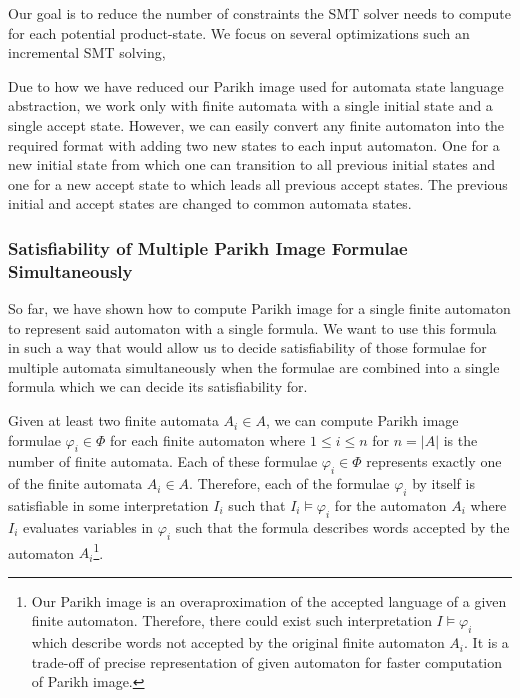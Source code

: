 
Our goal is to reduce the number of constraints the SMT solver needs to compute for each potential product-state. We focus on several optimizations such an incremental SMT solving,

Due to how we have reduced our Parikh image used for automata state language abstraction, we work only with finite automata with a single initial state and a single accept state. However, we can easily convert any finite automaton into the required format with adding two new states to each input automaton. One for a new initial state from which one can transition to all previous initial states and one for a new accept state to which leads all previous accept states. The previous initial and accept states are changed to common automata states.




\subsubsection{Satisfiability of Multiple Parikh Image Formulae Simultaneously}

So far, we have shown how to compute Parikh image for a single finite automaton to represent said automaton with a single formula. We want to use this formula in such a way that would allow us to decide satisfiability of those formulae for multiple automata simultaneously when the formulae are combined into a single formula which we can decide its satisfiability for.

Given at least two finite automata $A_i \in A$, we can compute Parikh image formulae $\varphi_i \in \Phi$ for each finite automaton where $1 \leq i \leq n$ for $n = |A|$ is the number of finite automata. Each of these formulae $\varphi_i \in \Phi$ represents exactly one of the finite automata $A_i \in A$. Therefore, each of the formulae $\varphi_i$ by itself is satisfiable in some interpretation $I_i$ such that $I_i \models \varphi_i$ for the automaton $A_i$ where $I_i$ evaluates variables in $\varphi_i$ such that the formula describes words accepted by the automaton $A_i$\footnote{Our Parikh image is an overaproximation of the accepted language of a given finite automaton. Therefore, there could exist such interpretation $I \models \varphi_i$ which describe words not accepted by the original finite automaton $A_i$. It is a trade-off of precise representation of given automaton  for faster computation of Parikh image.}.

